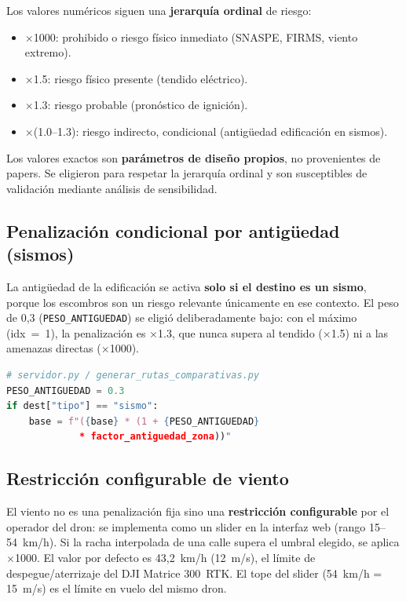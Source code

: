 \documentclass[conference]{IEEEtran}
\begin{document}
Los valores numéricos siguen una \textbf{jerarquía ordinal} de riesgo:
\begin{itemize}[itemsep=1pt]
\item $\times$1000: prohibido o riesgo físico inmediato (SNASPE, FIRMS, viento extremo).
\item $\times$1.5: riesgo físico presente (tendido eléctrico).
\item $\times$1.3: riesgo probable (pronóstico de ignición).
\item $\times$(1.0--1.3): riesgo indirecto, condicional (antigüedad edificación en sismos).
\end{itemize}

Los valores exactos son \textbf{parámetros de diseño propios}, no provenientes de papers. Se eligieron para respetar la jerarquía ordinal y son susceptibles de validación mediante análisis de sensibilidad.

\subsection{Penalización condicional por antigüedad (sismos)}

La antigüedad de la edificación se activa \textbf{solo si el destino es un sismo}, porque los escombros son un riesgo relevante únicamente en ese contexto. El peso de 0,3 (\texttt{PESO\_ANTIGUEDAD}) se eligió deliberadamente bajo: con el máximo (idx~=~1), la penalización es $\times$1.3, que nunca supera al tendido ($\times$1.5) ni a las amenazas directas ($\times$1000).

\begin{lstlisting}[language=Python]
# servidor.py / generar_rutas_comparativas.py
PESO_ANTIGUEDAD = 0.3
if dest["tipo"] == "sismo":
    base = f"({base} * (1 + {PESO_ANTIGUEDAD}
             * factor_antiguedad_zona))"
\end{lstlisting}

\subsection{Restricción configurable de viento}

El viento no es una penalización fija sino una \textbf{restricción configurable} por el operador del dron: se implementa como un slider en la interfaz web (rango 15--54~km/h). Si la racha interpolada de una calle supera el umbral elegido, se aplica $\times$1000. El valor por defecto es 43,2~km/h (12~m/s), el límite de despegue/aterrizaje del DJI Matrice 300~RTK. El tope del slider (54~km/h = 15~m/s) es el límite en vuelo del mismo dron.
\end{document}
